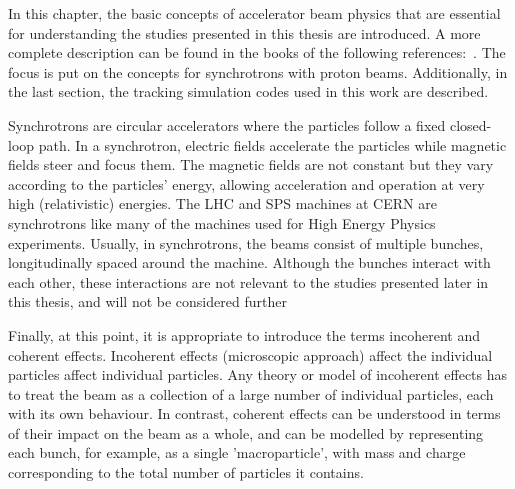 In this chapter, the basic concepts of accelerator beam physics that are essential for understanding the studies presented in this thesis are introduced. A more complete description can be found in the books of the following references:~\cite{wolski2014, Wiedemann:1083415, Lee:1425444}. The focus is put on the concepts for synchrotrons with proton beams. Additionally, in the last section, the tracking simulation codes used in this work are described.

Synchrotrons are circular accelerators where the particles follow a fixed closed-loop path. In a synchrotron, electric fields accelerate the particles while magnetic fields steer and focus them. The magnetic fields are not constant but they vary according to the particles' energy, allowing acceleration and operation at very high (relativistic) energies. The LHC and SPS machines at CERN are synchrotrons like many of the machines used for High Energy Physics experiments. Usually, in synchrotrons, the beams consist of multiple bunches, longitudinally spaced around the machine.  Although the bunches interact with each other, these interactions are not relevant to the studies presented later in this thesis, and will not be considered further

Finally, at this point, it is appropriate to introduce the terms incoherent and coherent effects. Incoherent effects (microscopic approach) affect the individual particles affect individual particles.  Any theory or model of incoherent effects has to treat the beam as a collection of a large number of individual particles, each with its own behaviour. In contrast, coherent effects can be understood in terms of their impact on the beam as a whole, and can be modelled by representing each bunch, for example, as a single 'macroparticle', with mass and charge corresponding to the total number of particles it contains. %




